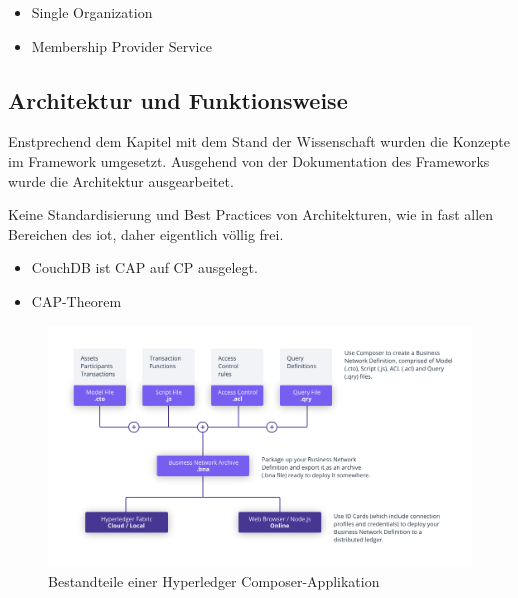         \begin{itemize}[noitemsep]
            \item Single Organization 
            \item Membership Provider Service
        \end{itemize}
    
\subsection{Architektur und Funktionsweise}
\label{sec:prototype_arch}
    Enstprechend dem Kapitel mit dem Stand der Wissenschaft wurden die Konzepte im Framework umgesetzt.
    Ausgehend von der Dokumentation des Frameworks \cite{ComposerDocs} wurde die Architektur ausgearbeitet. 
    
    Keine Standardisierung und Best Practices von Architekturen, wie in fast allen Bereichen des \gls{iot}, daher eigentlich völlig frei.
    
    
    \begin{itemize}
        \item CouchDB ist CAP auf CP ausgelegt.
        \item CAP-Theorem \cite{Brewer2012}
    \end{itemize}
    
    
    \begin{figure}[H]
		\centering
		\includegraphics[width=\textwidth]{graphics/Composer-Diagram.png}
		\caption[Bestandteile einer Hyperledger Composer-Applikation]{Bestandteile einer Hyperledger Composer-Applikation\cite{ComposerDocs}}
		\label{fig:composer_arch}
	\end{figure}
    
